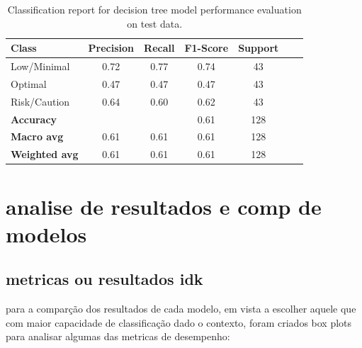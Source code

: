 \documentclass[conference]{IEEEtran}
\begin{document}
\begin{table}[H]
\centering
\caption{Classification report for decision tree model performance evaluation on test data.}
\begin{tabular}{lcccccc}
\toprule
\textbf{Class} & \textbf{Precision} & \textbf{Recall} & \textbf{F1-Score} & \textbf{Support} \\
\midrule
Low/Minimal & 0.72 & 0.77 & 0.74 & 43 \\
Optimal & 0.47 & 0.47 & 0.47 & 43 \\
Risk/Caution & 0.64 & 0.60 & 0.62 & 43 \\
\midrule
\textbf{Accuracy} &  &  & 0.61 & 128 \\
\textbf{Macro avg} & 0.61 & 0.61 & 0.61 & 128 \\
\textbf{Weighted avg} & 0.61 & 0.61 & 0.61 & 128 \\
\bottomrule
\end{tabular}
\end{table}

\section{analise de resultados e comp de modelos}

\subsection{metricas ou resultados idk}

para a comparção dos resultados de cada modelo, em vista a escolher aquele que com maior capacidade de classificação dado o contexto, foram criados box plots para analisar algumas das metricas de desempenho:
\end{document}
